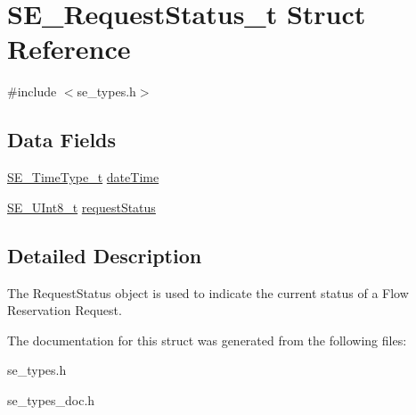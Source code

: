 \hypertarget{structSE__RequestStatus__t}{}\section{S\+E\+\_\+\+Request\+Status\+\_\+t Struct Reference}
\label{structSE__RequestStatus__t}


{\ttfamily \#include $<$se\+\_\+types.\+h$>$}

\subsection*{Data Fields}
\begin{DoxyCompactItemize}
\item 
\hyperlink{group__TimeType_ga6fba87a5b57829b4ff3f0e7638156682}{S\+E\+\_\+\+Time\+Type\+\_\+t} \hyperlink{group__RequestStatus_ga5a17406904af9612df11590a4fd8b1fe}{date\+Time}
\item 
\hyperlink{group__UInt8_gaf7c365a1acfe204e3a67c16ed44572f5}{S\+E\+\_\+\+U\+Int8\+\_\+t} \hyperlink{group__RequestStatus_ga5c594ed3fb20fdf8681c8dfd7957c78d}{request\+Status}
\end{DoxyCompactItemize}


\subsection{Detailed Description}
The Request\+Status object is used to indicate the current status of a Flow Reservation Request. 

The documentation for this struct was generated from the following files\+:\begin{DoxyCompactItemize}
\item 
se\+\_\+types.\+h\item 
se\+\_\+types\+\_\+doc.\+h\end{DoxyCompactItemize}
